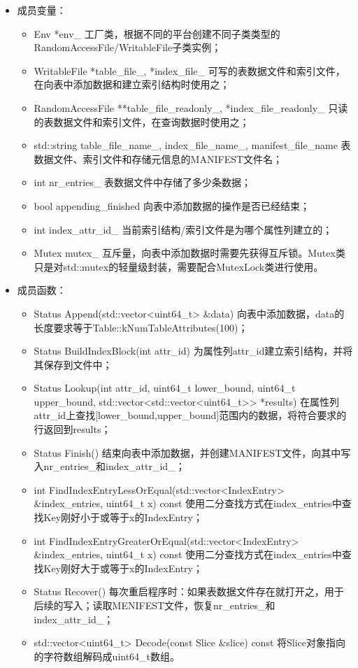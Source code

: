 \documentclass[bachelor]{thesis-uestc}
\begin{document}
\begin{itemize}
	\item 成员变量：
	\begin{itemize}
		\item Env *env\_ 工厂类，根据不同的平台创建不同子类类型的RandomAccessFile/WritableFile子类实例；
		\item WritableFile *table\_file\_, *index\_file\_ 可写的表数据文件和索引文件，在向表中添加数据和建立索引结构时使用之；
		\item RandomAccessFile **table\_file\_readonly\_, *index\_file\_readonly\_ 只读的表数据文件和索引文件，在查询数据时使用之；
		\item std::string table\_file\_name\_, index\_file\_name\_, manifest\_file\_name 表数据文件、索引文件和存储元信息的MANIFEST文件名；
		\item int nr\_entries\_ 表数据文件中存储了多少条数据；
		\item bool appending\_finished 向表中添加数据的操作是否已经结束；
		\item int index\_attr\_id\_ 当前索引结构/索引文件是为哪个属性列建立的；
		\item Mutex mutex\_ 互斥量，向表中添加数据时需要先获得互斥锁。Mutex类只是对std::mutex的轻量级封装，需要配合MutexLock类进行使用。
	\end{itemize}
	\item 成员函数：
	\begin{itemize}
		\item Status Append(std::vector<uint64\_t> \&data) 向表中添加数据，data的长度要求等于Table::kNumTableAttributes(100)；
		\item Status BuildIndexBlock(int attr\_id) 为属性列attr\_id建立索引结构，并将其保存到文件中；
		\item Status Lookup(int attr\_id, uint64\_t lower\_bound, uint64\_t upper\_bound, std::vector<std::vector<uint64\_t>> *results) 在属性列attr\_id上查找[lower\_bound,upper\_bound]范围内的数据，将符合要求的行返回到results；
		\item Status Finish() 结束向表中添加数据，并创建MANIFEST文件，向其中写入nr\_entries\_和index\_attr\_id\_；
		\item int FindIndexEntryLessOrEqual(std::vector<IndexEntry> \&index\_entries, uint64\_t x) const 使用二分查找方式在index\_entries中查找Key刚好小于或等于x的IndexEntry；
		\item int FindIndexEntryGreaterOrEqual(std::vector<IndexEntry> \&index\_entries, uint64\_t x) const 使用二分查找方式在index\_entries中查找Key刚好大于或等于x的IndexEntry；
		\item Status Recover() 每次重启程序时：如果表数据文件存在就打开之，用于后续的写入；读取MENIFEST文件，恢复nr\_entries\_和index\_attr\_id\_；
		\item std::vector<uint64\_t> Decode(const Slice \&slice) const 将Slice对象指向的字符数组解码成uint64\_t数组。
	\end{itemize}
\end{itemize}
\end{document}
